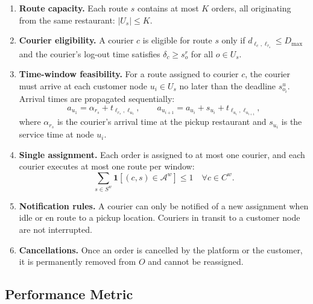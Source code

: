 \begin{enumerate}
    \item \textbf{Route capacity.}
    Each route $s$ contains at most $K$ orders, all originating
    from the same restaurant: $|U_s| \leq K$.

    \item \textbf{Courier eligibility.}
    A courier $c$ is eligible for route $s$ only if
    $d_{\ell_c, \ell_{r_s}} \leq D_{\max}$ and the courier's
    log-out time satisfies $\delta_c \geq s^r_{o}$
    for all $o \in U_s$.

    \item \textbf{Time-window feasibility.}
    For a route assigned to courier $c$, the courier must arrive
    at each customer node $u_i \in U_s$ no later than the
    deadline $s^u_{o_i}$.
    Arrival times are propagated sequentially:
    \begin{equation}
        a_{u_1} = \alpha_{r_s} + t_{\ell_{r_s}, \ell_{u_1}},
        \qquad
        a_{u_{i+1}} = a_{u_i} + s_{u_i} + t_{\ell_{u_i}, \ell_{u_{i+1}}},
    \end{equation}
    where $\alpha_{r_s}$ is the courier's arrival time at the
    pickup restaurant and $s_{u_i}$ is the service time at node $u_i$.

    \item \textbf{Single assignment.}
    Each order is assigned to at most one courier,
    and each courier executes at most one route per window:
    \begin{equation}
        \sum_{s \in S^w} \mathbf{1}[(c,s) \in \mathcal{A}^w] \leq 1
        \quad \forall c \in C^w.
    \end{equation}

    \item \textbf{Notification rules.}
    A courier can only be notified of a new assignment when
    idle or en route to a pickup location.
    Couriers in transit to a customer node are not interrupted.

    \item \textbf{Cancellations.}
    Once an order is cancelled by the platform or the customer,
    it is permanently removed from $O$ and cannot be reassigned.
\end{enumerate}

\subsection{Performance Metric}\label{subsec:objectives}

